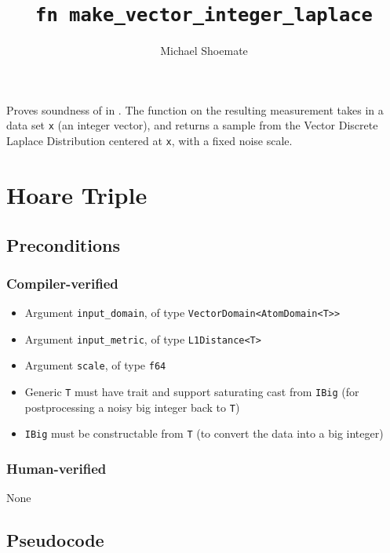 \documentclass{article}
\title{\texttt{fn make\_vector\_integer\_laplace}}
\author{Michael Shoemate}
\begin{document}
\maketitle

Proves soundness of  in .
The function on the resulting measurement takes in a data set \texttt{x} (an integer vector), 
and returns a sample from the Vector Discrete Laplace Distribution centered at \texttt{x}, with a fixed noise scale.

\section{Hoare Triple}

\subsection*{Preconditions}
\subsubsection*{Compiler-verified}
\begin{itemize}
    \item Argument \texttt{input\_domain}, of type \texttt{VectorDomain<AtomDomain<T>>}
    \item Argument \texttt{input\_metric}, of type \texttt{L1Distance<T>}
    \item Argument \texttt{scale}, of type \texttt{f64}
    \item Generic \texttt{T} must have trait  and support saturating cast from \texttt{IBig} (for postprocessing a noisy big integer back to \texttt{T})
    \item \texttt{IBig} must be constructable from \texttt{T} (to convert the data into a big integer)
\end{itemize}

\subsubsection*{Human-verified}
None

\subsection*{Pseudocode}

\end{document}
